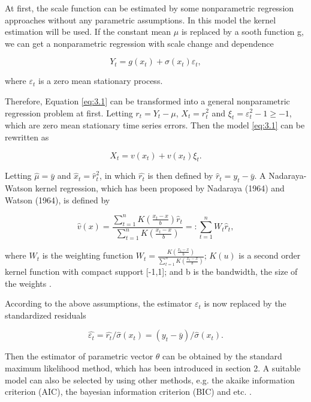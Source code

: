 At first, the scale function can be estimated by some nonparametric regression approaches without any parametric assumptions. In this model the kernel estimation will be used. If the constant mean $\mu$ is replaced by a sooth function g, we can get a nonparametric regression with scale change and dependence

\begin{equation}
\label{equ3.5}
Y_t= g(x_t)+\sigma(x_t)\varepsilon_t,
\end{equation}

where ${\varepsilon_t}$ is a zero mean stationary process.


Therefore, Equation \ref{eq:3.1} can be transformed into a general nonparametric regression problem at first. Letting $ r_{t}=Y_{t}-\mu$, $X_{t}=r_{t}^{2}$ and $\xi_{t}=\varepsilon_{t}^{2}-1 \geq -1$, which are zero mean stationary time series errors. Then the model \ref{eq:3.1} can be rewritten as 

\begin{equation}
\label{equ3.4}
 X_{t} = v(x_{t} )+ v(x_{t})\xi_{t}.
\end{equation}


Letting $\hat{\mu }=\bar{y}$ and $\hat{x}_{t} = \hat{r}_{t}^{2}$, in which $\hat{r_{t}}$ is then defined by $\hat{r}_{t}=y_{t}-\bar{y}$. A Nadaraya-Watson kernel regression, which has been proposed by Nadaraya (1964) and Watson (1964), is defined by

\begin{equation}
\hat{v}(x)=\frac{\sum_{t=1}^{n}K(\frac{x_t-x}{b})\hat{r}_t}{\sum_{t=1}^{n}K(\frac{x_t-x}{b})}=:\sum_{t=1}^nW_t\hat{r}_t,
\end{equation}

where $W_t$ is the weighting function $W_t= \frac{K(\frac{x_t-x}{b})}{\sum_{t=1}^{n}K(\frac{x_t-x}{b})} $; $K(u)$ is a second order kernel function with compact support [-1,1]; and b is the bandwidth, the size of the weights \citep{Fan1993}. 

According to the above assumptions, the estimator $\varepsilon_{t}$ is now replaced by the standardized residuals

\begin{equation}
\hat{\varepsilon_t }=\hat{r_t}/\hat{\sigma }(x_t)=(y_t-\bar{y})/\hat{\sigma}(x_t). 
\end{equation}

Then the estimator of parametric vector $\theta$ can be obtained by the standard maximum likelihood method, which has been introduced in section 2. A suitable model can also be selected by using other methods, e.g. the akaike information criterion (AIC), the bayesian information criterion (BIC) and etc. \citep{Feng2004}.



